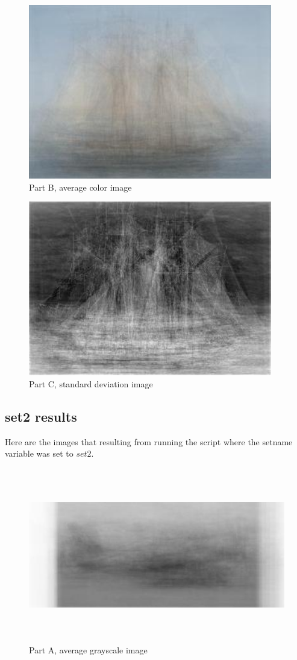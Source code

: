 \documentclass[11pt,psfig]{article}
\begin{document}
\begin{figure}[H]
\centering
\includegraphics[height=3in]{set1color.jpg}
\caption{Part B, average color image}
\end{figure}

\begin{figure}[H]
\centering
\includegraphics[height=3in]{set1grayscaleStndDev.jpg}
\caption{Part C, standard deviation image}
\end{figure}

\subsection*{set2 results}

Here are the images that resulting from running the script where the setname variable was set to $set2$. 

\begin{figure}[H]
\centering
\includegraphics[height=3in]{set2grayscale.jpg}
\caption{Part A, average grayscale image}
\end{figure}
\end{document}
